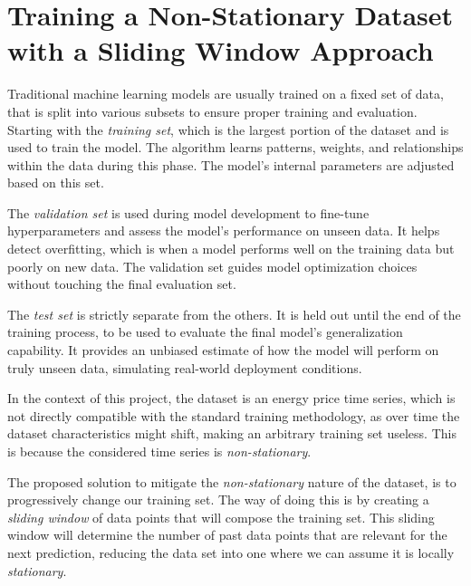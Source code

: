 \documentclass[12pt]{report} %
\begin{document}
\section{Training a Non-Stationary Dataset with a Sliding Window Approach}

Traditional machine learning models are usually trained on a fixed set of data, that is split into various subsets to ensure proper training and evaluation. Starting with the \textit{training set}, which is the largest portion of the dataset and is used to train the model. The algorithm learns patterns, weights, and relationships within the data during this phase. The model’s internal parameters are adjusted based on this set.

The \textit{validation set} is used during model development to fine-tune hyperparameters and assess the model’s performance on unseen data. It helps detect overfitting, which is when a model performs well on the training data but poorly on new data. The validation set guides model optimization choices without touching the final evaluation set.

The \textit{test set} is strictly separate from the others. It is held out until the end of the training process, to be used to evaluate the final model’s generalization capability. It provides an unbiased estimate of how the model will perform on truly unseen data, simulating real-world deployment conditions.

In the context of this project, the dataset is an energy price time series, which is not directly compatible with the standard training methodology, as over time the dataset characteristics might shift, making an arbitrary training set useless. This is because the considered time series is \textit{non-stationary}.

The proposed solution to mitigate the \textit{non-stationary} nature of the dataset, is to progressively change our training set. The way of doing this is by creating a \textit{sliding window} of data points that will compose the training set. This sliding window will determine the number of past data points that are relevant for the next prediction, reducing the data set into one where we can assume it is locally \textit{stationary}.
\end{document}
